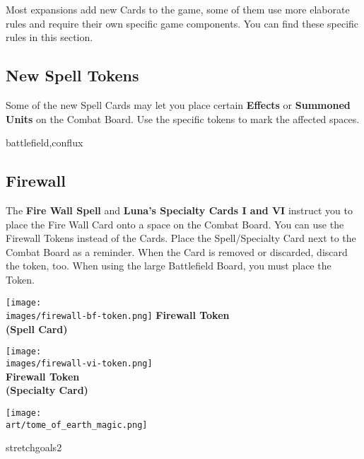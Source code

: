 

Most expansions add new Cards to the game, some of them use more elaborate rules and require their own specific game components.
You can find these specific rules in this section.

\begin{multicols}{2}

\subsection*{New Spell Tokens}
Some of the new Spell Cards may let you place certain \textbf{Effects} or \textbf{Summoned Units} on the Combat Board.
Use the specific tokens to mark the affected spaces.

\begin{expansion}{battlefield,conflux}
    \subsection*{Firewall}
    The \textbf{Fire Wall Spell} and \textbf{Luna's Specialty Cards I and VI} instruct you to place the Fire Wall Card onto a space on the Combat Board.
    You can use the Firewall Tokens instead of the Cards.
    Place the Spell/Specialty Card next to the Combat Board as a reminder.
    When the Card is removed or discarded, discard the token, too.
    When using the large Battlefield Board, you must place the Token.

    \medskip
    \begin{multicols}{2}
        \centering
        \texttt{[image: \\images/firewall-bf-token.png]}
        \textbf{\scriptsize\color{darkcandyapplered}Firewall Token\\ (Spell Card)}

        \columnbreak
        \texttt{[image: \\images/firewall-vi-token.png]}\\
        \textbf{\scriptsize\color{darkcandyapplered}Firewall Token\\ (Specialty Card)}
    \end{multicols}
\end{expansion}

\begin{center}
    \texttt{[image: \\art/tome\_of\_earth\_magic.png]}
\end{center}
\columnbreak
\begin{expansion}{stretchgoals2}

\end{expansion}
\end{multicols}
